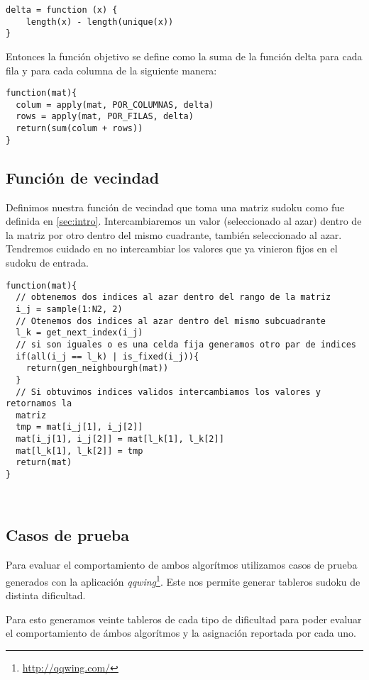 \documentclass[a4paper,spanish]{article}
\begin{document}
\begin{Verbatim}[samepage=true]
delta = function (x) {
    length(x) - length(unique(x))
} 
\end{Verbatim}

Entonces la función objetivo se define como la suma de la función delta para
cada fila y para cada columna de la siguiente manera:

\begin{Verbatim}[samepage=true]
function(mat){ 
  colum = apply(mat, POR_COLUMNAS, delta)
  rows = apply(mat, POR_FILAS, delta)
  return(sum(colum + rows))
} 
\end{Verbatim}


\subsection{Función de vecindad}

Definimos nuestra función de vecindad que toma una matriz sudoku como fue
definida en \ref{sec:intro}.
Intercambiaremos un valor (seleccionado al azar) dentro de la matriz por otro
dentro del mismo cuadrante, también seleccionado al azar. Tendremos cuidado en
no intercambiar los valores que ya vinieron fijos en el sudoku de entrada.

\begin{Verbatim}[samepage=true]
function(mat){
  // obtenemos dos indices al azar dentro del rango de la matriz
  i_j = sample(1:N2, 2) 
  // Otenemos dos indices al azar dentro del mismo subcuadrante
  l_k = get_next_index(i_j)
  // si son iguales o es una celda fija generamos otro par de indices
  if(all(i_j == l_k) | is_fixed(i_j)){
    return(gen_neighbourgh(mat))
  }
  // Si obtuvimos indices validos intercambiamos los valores y retornamos la
  matriz
  tmp = mat[i_j[1], i_j[2]]
  mat[i_j[1], i_j[2]] = mat[l_k[1], l_k[2]]
  mat[l_k[1], l_k[2]] = tmp
  return(mat)
}

    
\end{Verbatim}

\subsection{Casos de prueba}


Para evaluar el comportamiento de ambos algorítmos utilizamos casos de prueba
generados con la aplicación \emph{qqwing}\footnote{\url{http://qqwing.com/}}. Este nos permite generar tableros
sudoku de distinta dificultad.

Para esto generamos veinte tableros de cada tipo de dificultad para poder
evaluar el comportamiento de ámbos algorítmos y la asignación reportada por cada
uno.
\end{document}
